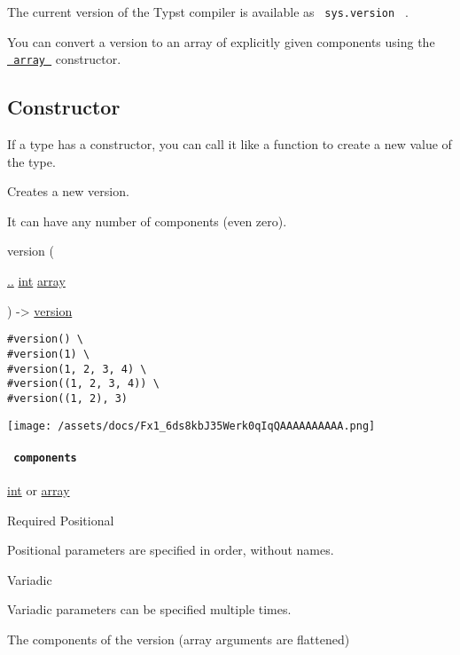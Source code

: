 The current version of the Typst compiler is available as
\texttt{\ sys.version\ } .

You can convert a version to an array of explicitly given components
using the \href{/docs/reference/foundations/array/}{\texttt{\ array\ }}
constructor.

\subsection{\texorpdfstring{Constructor
{}}{Constructor }}\label{constructor}

\label{constructor-constructor-tooltip}
If a type has a constructor, you can call it like a function to create a
new value of the type.

Creates a new version.

It can have any number of components (even zero).

{ version } (

{ \hyperref[constructor-parameters-components]{..}
\href{/docs/reference/foundations/int/}{int}
\href{/docs/reference/foundations/array/}{array} }

) -\textgreater{} \href{/docs/reference/foundations/version/}{version}

\begin{verbatim}
#version() \
#version(1) \
#version(1, 2, 3, 4) \
#version((1, 2, 3, 4)) \
#version((1, 2), 3)
\end{verbatim}

\texttt{[image: /assets/docs/Fx1\_6ds8kbJ35Werk0qIqQAAAAAAAAAA.png]}

\paragraph{\texorpdfstring{\texttt{\ components\ }}{ components }}\label{constructor-components}

\href{/docs/reference/foundations/int/}{int} {or}
\href{/docs/reference/foundations/array/}{array}

{Required} {{ Positional }}

\phantomsection\label{constructor-components-positional-tooltip}
Positional parameters are specified in order, without names.

{{ Variadic }}

\phantomsection\label{constructor-components-variadic-tooltip}
Variadic parameters can be specified multiple times.

The components of the version (array arguments are flattened)

